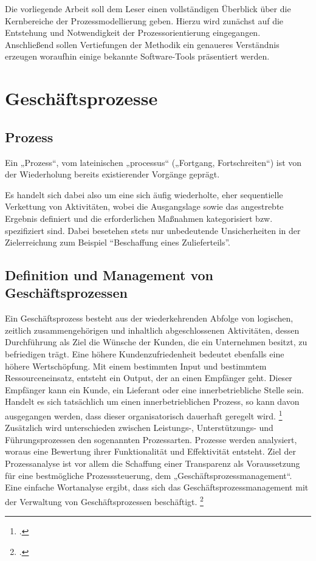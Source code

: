 Die vorliegende Arbeit soll dem Leser einen vollständigen Überblick über die
Kernbereiche der Prozessmodellierung geben. Hierzu wird zunächst auf die
Entstehung und Notwendigkeit der Prozessorientierung eingegangen. Anschließend
sollen Vertiefungen der Methodik ein genaueres Verständnis erzeugen woraufhin
einige bekannte Software-Tools präsentiert werden.

\clearpage
\section{Geschäftsprozesse}

\subsection{Prozess}


Ein „Prozess“, vom lateinischen „processus“ („Fortgang, Fortschreiten“) ist von
der Wiederholung bereits existierender Vorgänge geprägt.

Es handelt sich dabei also um eine sich äufig wiederholte, eher sequentielle
Verkettung von Aktivitäten, wobei die Ausgangslage sowie das
angestrebte Ergebnis definiert und die erforderlichen Maßnahmen
kategorisiert bzw. spezifiziert sind. Dabei besetehen stets nur
unbedeutende Unsicherheiten in der Zielerreichung zum Beispiel "`Beschaffung
eines Zulieferteils"'.

\subsection{Definition und Management von Geschäftsprozessen}


Ein Geschäftsprozess besteht aus der wiederkehrenden Abfolge von logischen,
zeitlich zusammengehörigen und inhaltlich abgeschlossenen Aktivitäten, dessen
Durchführung als Ziel die Wünsche der Kunden, die ein Unternehmen besitzt, zu befriedigen trägt.
Eine höhere Kundenzufriedenheit bedeutet ebenfalls eine höhere Wertschöpfung.
Mit einem bestimmten Input und bestimmtem Ressourceneinsatz,
entsteht ein Output, der an einen Empfänger geht.
Dieser Empfänger kann ein Kunde, ein Lieferant oder eine innerbetriebliche Stelle sein.
Handelt es sich tatsächlich um einen innerbetrieblichen Prozess,
so kann davon ausgegangen werden, dass dieser organisatorisch dauerhaft geregelt wird.
\footcite[Vgl.][ ]{prozess:db}\\



Zusätzlich wird unterschieden zwischen Leistungs-, Unterstützungs- und
Führungsprozessen den sogenannten Prozessarten. Prozesse werden analysiert,
woraus eine Bewertung ihrer Funktionalität und Effektivität entsteht.
Ziel der Prozessanalyse ist vor allem die Schaffung einer Transparenz als
Voraussetzung für eine bestmögliche Prozesssteuerung, dem „Geschäftsprozessmanagement“.
Eine einfache Wortanalyse ergibt, dass sich das Geschäftsprozessmanagement
mit der Verwaltung von Geschäftsprozessen beschäftigt.
\footcite[S.13]{lehmann}\\

